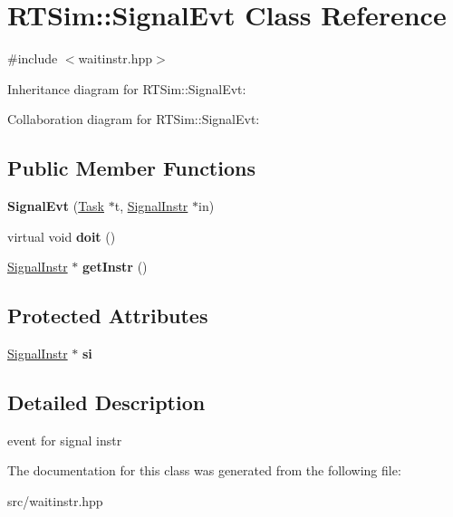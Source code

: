 \hypertarget{classRTSim_1_1SignalEvt}{}\section{R\+T\+Sim\+:\+:Signal\+Evt Class Reference}
\label{classRTSim_1_1SignalEvt}


{\ttfamily \#include $<$waitinstr.\+hpp$>$}



Inheritance diagram for R\+T\+Sim\+:\+:Signal\+Evt\+:


Collaboration diagram for R\+T\+Sim\+:\+:Signal\+Evt\+:
\subsection*{Public Member Functions}
\begin{DoxyCompactItemize}
\item 
{\bfseries Signal\+Evt} (\hyperlink{classRTSim_1_1Task}{Task} $\ast$t, \hyperlink{classRTSim_1_1SignalInstr}{Signal\+Instr} $\ast$in)\hypertarget{classRTSim_1_1SignalEvt_a7f0d5b612ecdbc2969b0d1b09f2206c5}{}\label{classRTSim_1_1SignalEvt_a7f0d5b612ecdbc2969b0d1b09f2206c5}

\item 
virtual void {\bfseries doit} ()\hypertarget{classRTSim_1_1SignalEvt_adc9c7141aca8b0449b705984dce6cbd4}{}\label{classRTSim_1_1SignalEvt_adc9c7141aca8b0449b705984dce6cbd4}

\item 
\hyperlink{classRTSim_1_1SignalInstr}{Signal\+Instr} $\ast$ {\bfseries get\+Instr} ()\hypertarget{classRTSim_1_1SignalEvt_aee701a0df83d051ce07c850637383f77}{}\label{classRTSim_1_1SignalEvt_aee701a0df83d051ce07c850637383f77}

\end{DoxyCompactItemize}
\subsection*{Protected Attributes}
\begin{DoxyCompactItemize}
\item 
\hyperlink{classRTSim_1_1SignalInstr}{Signal\+Instr} $\ast$ {\bfseries si}\hypertarget{classRTSim_1_1SignalEvt_a9d9a7e478dc12cc16d08c646e280e9ac}{}\label{classRTSim_1_1SignalEvt_a9d9a7e478dc12cc16d08c646e280e9ac}

\end{DoxyCompactItemize}


\subsection{Detailed Description}
event for signal instr 

The documentation for this class was generated from the following file\+:\begin{DoxyCompactItemize}
\item 
src/waitinstr.\+hpp\end{DoxyCompactItemize}
